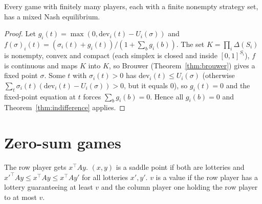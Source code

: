 \begin{theorem}
\label{thm:nash-existence}
\leanok
{}
Every game with finitely many players, each with a finite nonempty strategy set, has a mixed Nash equilibrium.
\end{theorem}
\begin{proof}
\leanok
Let $g_i(t) = \max(0, \mathrm{dev}_i(t) - U_i(\sigma))$ and
$f(\sigma)_i(t) = (\sigma_i(t) + g_i(t))/(1 + \sum_b g_i(b))$. The set $K = \prod_i \Delta(S_i)$ is nonempty,
convex and compact (each simplex is closed and inside $[0,1]^{S_i}$), $f$ is continuous and maps $K$ into $K$,
so Brouwer (Theorem~\ref{thm:brouwer}) gives a fixed point $\sigma$. Some $t$ with $\sigma_i(t) > 0$ has
$\mathrm{dev}_i(t) \le U_i(\sigma)$ (otherwise $\sum_t \sigma_i(t)(\mathrm{dev}_i(t) - U_i(\sigma)) > 0$, but it equals $0$),
so $g_i(t) = 0$ and the fixed-point equation at $t$ forces $\sum_b g_i(b) = 0$. Hence all $g_i(b) = 0$ and
Theorem~\ref{thm:indifference} applies.
\end{proof}

\section{Zero-sum games}
\label{sec:zerosum}

\begin{definition}
\label{def:matrix-game}
\leanok
{}
The row player gets $x^\top A y$. $(x,y)$ is a saddle point if both are lotteries and
$x'^\top A y \le x^\top A y \le x^\top A y'$ for all lotteries $x', y'$. $v$ is a value if the row player has a
lottery guaranteeing at least $v$ and the column player one holding the row player to at most $v$.
\end{definition}

